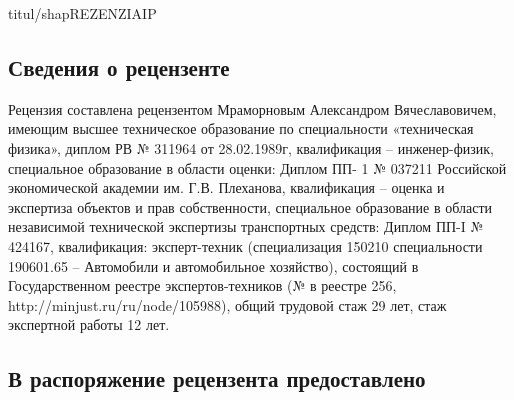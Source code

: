 \setcounter{page}{1}
%
 {titul/shapREZENZIAIP}
%
\subsection{ Сведения о рецензенте}

Рецензия составлена рецензентом Мраморновым Александром Вячеславовичем, имеющим высшее техническое образование по специальности «техническая физика», диплом РВ № 311964 от 28.02.1989г, квалификация -- инженер-физик, специальное образование в области оценки: Диплом ПП- 1 № 037211 Российской экономической академии им. Г.В. Плеханова, квалификация -- оценка и экспертиза объектов и прав собственности, специальное образование в области независимой технической экспертизы транспортных средств: Диплом ПП-I № 424167, квалификация: эксперт-техник (специализация 150210 специальности 190601.65 -- Автомобили и автомобильное хозяйство), состоящий в Государственном реестре экспертов-техников (№ в реестре 256, http://minjust.ru/ru/node/105988),  общий трудовой  стаж 29 лет, стаж  экспертной работы  12 лет.


\subsection{В распоряжение рецензента предоставлено}

